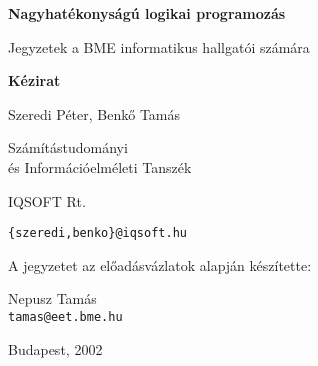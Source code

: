 \vspace*{3cm}
\thispagestyle{empty}

\centerline{\Huge\bf Nagyhatékonyságú logikai programozás}

\vspace{0.5cm}

\centerline{\Large  Jegyzetek a BME informatikus hallgatói számára}
\vspace{1cm}

\centerline{\large\bf Kézirat}
\vspace{3cm}


\begin{center}
{\Large Szeredi Péter, Benk{\H o} Tamás
	\vspace{0.3cm}
	
	Számítástudományi\\
	és Információelméleti Tanszék
	\vspace{0.3cm}
	
	IQSOFT Rt.}
\vspace{0.3cm}

{\large\tt \{szeredi,benko\}@iqsoft.hu}

\vspace{2cm}

{\large A jegyzetet az előadásvázlatok alapján készítette:\\
	
	\vspace{0.3cm}
	
	\Large Nepusz Tamás \\
	\vspace{0.3cm}
	{\large\tt tamas@eet.bme.hu}
}
	
\end{center}

\vspace{3cm}

\centerline{\large Budapest, 2002}

\clearpage
